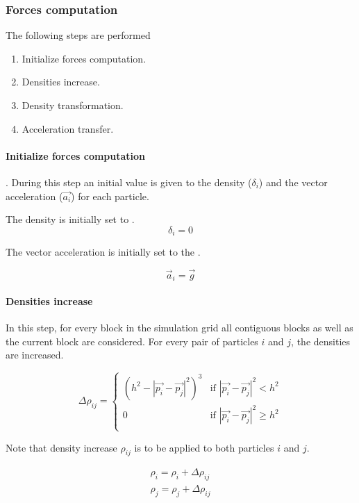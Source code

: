 \subsubsection{Forces computation}

The following steps are performed

\begin{enumerate}
\item Initialize forces computation.
\item Densities increase.
\item Density transformation.
\item Acceleration transfer.
\end{enumerate}

\paragraph{Initialize forces computation}.
During this step an initial value is given to the density ($\delta_i$) and the
vector acceleration ($\vec{a_i}$) for each particle.

The density is initially set to .
\[
\delta_i = 0
\]

The vector acceleration is initially set to the .

\[
\vec{a}_i = \vec{g}
\]

\paragraph{Densities increase}
In this step, for every block in the simulation grid all contiguous blocks as
well as the current block are considered. For every pair of particles $i$ and
$j$, the densities are increased.

\[
\Delta \rho_{ij} = 
    \begin{cases}
      (h^2 - |\vec{p_i} - \vec{p_j}|^2)^3 & 
          \text{if  } |\vec{p_i} - \vec{p_j}|^2 < h^2\\
      0 & 
          \text{if  } |\vec{p_i} - \vec{p_j}|^2 \geq h^2\\
    \end{cases}
\]

Note that density increase $\rho_{ij}$ is to be applied to both particles $i$ and $j$.

\[
\begin{split}
\rho_i = \rho_i + \Delta \rho_{ij}\\
\rho_j = \rho_j + \Delta \rho_{ij}\\
\end{split}
\]

